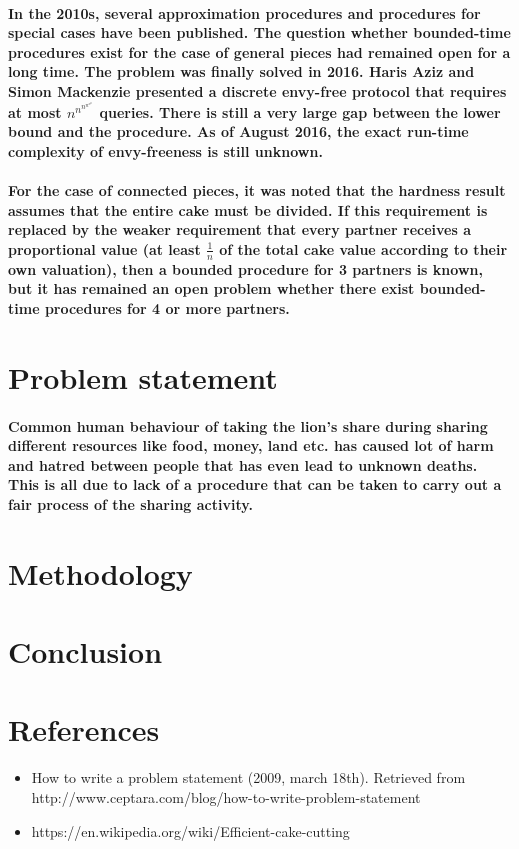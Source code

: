 \documentclass[12pt]{report}
\begin{document}
	\paragraph{In the 2010s, several approximation procedures and procedures for special cases have been published. The question whether bounded-time procedures exist for the case of general pieces had remained open for a long time. The problem was finally solved in 2016. Haris Aziz and Simon Mackenzie presented a discrete envy-free protocol that requires \\
		at most ${\displaystyle n^{n^{n^{n^{n^{n}}}}}}$ queries. There is still a very large gap between the lower bound and the procedure. As of August 2016, the exact run-time complexity of envy-freeness is still unknown. }
	\paragraph{For the case of connected pieces, it was noted that the hardness result assumes that the entire cake must be divided. If this requirement is replaced by the weaker requirement that every partner receives a proportional value (at least $\frac{1}{n}$ of the total cake value according to their own valuation), then a bounded procedure for 3 partners is known, but it has remained an open problem whether there exist bounded-time procedures for 4 or more partners.
	}
	\section{Problem statement}
	\paragraph{Common human behaviour of taking the lion's share during sharing different resources like food, money, land etc. has caused lot of harm and hatred between people that has even lead to unknown deaths. This is all due to lack of a procedure that can be taken to carry out a fair process of the sharing activity. }

	\section{Methodology}
	\paragraph{}
	\section{Conclusion}
	\section{References}
	\begin{itemize}
		\item {How to write a problem statement (2009, march 18th). Retrieved from   http://www.ceptara.com/blog/how-to-write-problem-statement}
		
		\item {https://en.wikipedia.org/wiki/Efficient-cake-cutting}
	\end{itemize}
	
	
	
\end{document}
